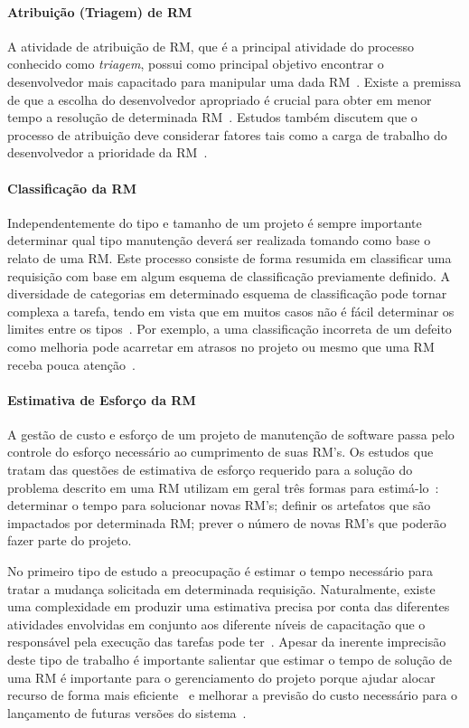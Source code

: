 \todoend


\paragraph{Atribuição (Triagem) de RM} A atividade de atribuição de RM, que é a
principal atividade do processo conhecido como \textit{triagem}, possui como
principal objetivo encontrar o desenvolvedor mais capacitado para manipular uma
dada RM~\cite{cavalcanti2014challenges}. Existe a premissa de que a escolha do
desenvolvedor apropriado é crucial para obter em menor tempo a re\-so\-lu\-ção
de determinada RM~\cite{di2002approach}. Estudos também discutem que o processo
de atribuição deve considerar fatores tais como a carga de trabalho do
desenvolvedor a prioridade da RM~\cite{aljarah2011selecting}.

\paragraph{Classificação da RM} Independentemente do tipo e tamanho de um
projeto é sempre importante determinar qual tipo manutenção deverá ser realizada
tomando como base o relato de uma RM\@.  Este processo consiste de forma
resumida em classificar uma requisição com base em algum esquema de
classificação previamente definido. A diversidade de categorias em determinado
esquema de classificação pode tornar complexa a tarefa, tendo em vista que em
muitos casos não é fácil determinar os limites entre os
tipos~\cite{antoniol2008bug}. Por exemplo, a uma classificação incorreta de um
defeito como melhoria pode acarretar em atrasos no projeto ou mesmo que uma RM
receba pouca atenção~\cite{cavalcanti2014challenges}.

\paragraph{Estimativa de Esforço da RM} A gestão de custo e esforço de um
projeto de manutenção de software passa pelo controle do esforço necessário ao
cumprimento de suas RM's. Os estudos que tratam das questões de estimativa de
esforço requerido para a solução do problema descrito em uma RM utilizam em
geral três formas para estimá-lo~\cite{cavalcanti2014challenges}: determinar o
tempo para solucionar novas RM's; definir os artefatos que são impactados por
determinada RM\@; prever o número de novas RM's que poderão fazer parte do
projeto.

No primeiro tipo de estudo a preocupação é estimar o tempo necessário para
tratar a mudança solicitada em determinada requisição. Naturalmente, existe uma
complexidade em produzir uma estimativa precisa por conta das diferentes
atividades envolvidas em conjunto aos diferente níveis de capacitação que o
responsável pela execução das tarefas pode ter~\cite{xia2015automatic}.  Apesar
da inerente imprecisão deste tipo de trabalho é importante salientar que estimar
o tempo de solução de uma RM é importante para o gerenciamento do projeto porque
ajudar alocar recurso de forma mais
eficiente~\cite{Bhattacharya:2011:BTP:1985441.1985472} e melhorar a previsão do
custo necessário para o lançamento de futuras versões do
sistema~\cite{Vijayakumar2014}.

